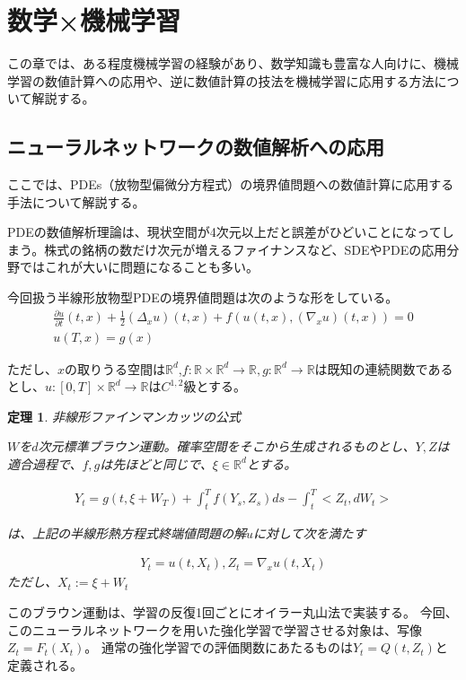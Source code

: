 \documentclass[dvipdfmx, a4paper]{jsarticle}
\newtheorem{theo}{定理}[section]
\begin{document}
\newpage
\section{数学×機械学習}
この章では、ある程度機械学習の経験があり、数学知識も豊富な人向けに、機械学習の数値計算への応用や、逆に数値計算の技法を機械学習に応用する方法について解説する。

\subsection{ニューラルネットワークの数値解析への応用}
ここでは、PDEs（放物型偏微分方程式）の境界値問題への数値計算に応用する手法について解説する。

PDEの数値解析理論は、現状空間が4次元以上だと誤差がひどいことになってしまう。株式の銘柄の数だけ次元が増えるファイナンスなど、SDEやPDEの応用分野ではこれが大いに問題になることも多い。
 
今回扱う半線形放物型PDEの境界値問題は次のような形をしている。
\begin{align}
\frac{\partial u}{\partial t}(t,x)+\frac{1}{2}(\Delta_xu)(t,x)+f(u(t,x),(\nabla_xu)(t,x))=0\\
u(T,x)=g(x)
\end{align}


ただし、$x$の取りうる空間は$\mathbb{R}^d$,$f:\mathbb{R}\times\mathbb{R}^d\rightarrow \mathbb{R},g:\mathbb{R}^d\rightarrow\mathbb{R}$は既知の連続関数であるとし、$u:[0,T]\times\mathbb{R}^d\rightarrow \mathbb{R}$は$C^{1,2}$級とする。

\begin{theo}非線形ファインマンカッツの公式

$W$を$d$次元標準ブラウン運動。確率空間をそこから生成されるものとし、$Y,Z$は適合過程で、$f,g$は先ほどと同じで、$\xi\in\mathbb{R}^d$とする。

\begin{align}
Y_t=g(t,\xi+W_T)+\int^T_tf(Y_s,Z_s)ds-\int^T_t<Z_t,dW_t>
\end{align}

は、上記の半線形熱方程式終端値問題の解$u$に対して次を満たす

\begin{align}
Y_t=u(t,X_t),Z_t=\nabla_xu(t,X_t)
\end{align}
ただし、$X_t:=\xi+W_t$
\end{theo}

このブラウン運動は、学習の反復1回ごとにオイラー丸山法で実装する。
今回、このニューラルネットワークを用いた強化学習で学習させる対象は、写像$Z_t=F_t(X_t)$。
通常の強化学習での評価関数にあたるものは$Y_t=Q(t,Z_t)$と定義される。
\end{document}
